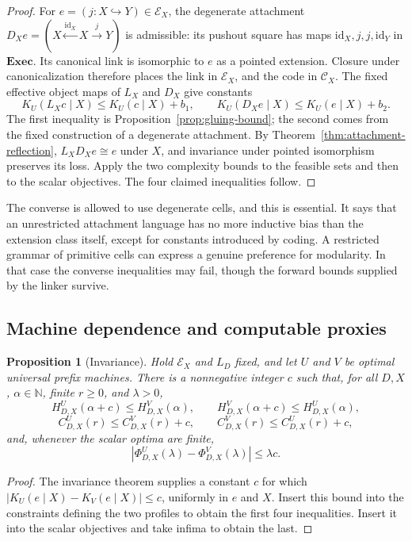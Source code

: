 \documentclass[11pt]{article}
\newtheorem{proposition}[theorem]{Proposition}
\newcommand{\N}{\mathbb{N}}
\newcommand{\Exec}{\mathbf{Exec}}
\newcommand{\K}{K_U}
\begin{document}
\begin{proof}
For \(e=(j:X\hookrightarrow Y)\in\mathcal E_X\), the degenerate attachment
\(D_Xe=(X\xleftarrow{\mathrm{id}_X}X\xrightarrow{j}Y)\) is admissible: its
pushout square has maps \(\mathrm{id}_X,j,j,\mathrm{id}_Y\) in \(\Exec\).
Its canonical link is isomorphic to \(e\) as a pointed extension.  Closure
under canonicalization therefore places the link in \(\mathcal E_X\), and the
code in \(\mathcal C_X\).
The fixed effective object maps of \(L_X\) and \(D_X\) give constants
\[
 \K(L_Xc\mid X)\le\K(c\mid X)+b_1,
 \qquad
 \K(D_Xe\mid X)\le\K(e\mid X)+b_2.
\]
The first inequality is Proposition~\ref{prop:gluing-bound}; the second comes
from the fixed construction of a degenerate attachment.  By
Theorem~\ref{thm:attachment-reflection},
\(L_XD_Xe\cong e\) under \(X\),
and invariance under pointed isomorphism preserves its loss.  Apply the two
complexity bounds to the feasible sets and then to the scalar objectives.  The
four claimed inequalities follow.
\end{proof}

The converse is allowed to use degenerate cells, and this is essential.  It
says that an unrestricted attachment language has no more inductive bias than
the extension class itself, except for constants introduced by coding.  A
restricted grammar of primitive cells can express a genuine preference for
modularity.  In that case the converse inequalities may fail, though the
forward bounds supplied by the linker survive.

\subsection{Machine dependence and computable proxies}

\begin{proposition}[Invariance]
Hold \(\mathcal E_X\) and \(L_D\) fixed, and let \(U\) and \(V\) be optimal
universal prefix machines.  There is a nonnegative integer \(c\) such that,
for all \(D,X\), \(\alpha\in\N\), finite \(r\ge0\), and \(\lambda>0\),
\[
 H^{U}_{D,X}(\alpha+c)\le H^{V}_{D,X}(\alpha),
 \qquad
 H^{V}_{D,X}(\alpha+c)\le H^{U}_{D,X}(\alpha),
\]
\[
 C^{U}_{D,X}(r)\le C^{V}_{D,X}(r)+c,
 \qquad
 C^{V}_{D,X}(r)\le C^{U}_{D,X}(r)+c,
\]
and, whenever the scalar optima are finite,
\[
 |\Phi^{U}_{D,X}(\lambda)-\Phi^{V}_{D,X}(\lambda)|
 \le\lambda c.
\]
\end{proposition}

\begin{proof}
The invariance theorem supplies a constant \(c\) for which
\(|K_U(e\mid X)-K_V(e\mid X)|\le c\), uniformly in \(e\) and \(X\).  Insert
this bound into the constraints defining the two profiles to obtain the first
four inequalities.  Insert it into the scalar objectives and take infima to
obtain the last.
\end{proof}
\end{document}
